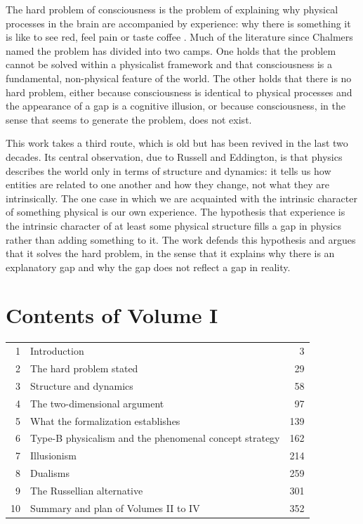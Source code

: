 \documentclass{situationist-preprint}
\begin{document}
The hard problem of consciousness is the problem of explaining why physical processes in the brain are accompanied by experience: why there is something it is like to see red, feel pain or taste coffee \citep{Chalmers1995}. Much of the literature since Chalmers named the problem has divided into two camps. One holds that the problem cannot be solved within a physicalist framework and that consciousness is a fundamental, non-physical feature of the world. The other holds that there is no hard problem, either because consciousness is identical to physical processes and the appearance of a gap is a cognitive illusion, or because consciousness, in the sense that seems to generate the problem, does not exist.

This work takes a third route, which is old but has been revived in the last two decades. Its central observation, due to Russell and Eddington, is that physics describes the world only in terms of structure and dynamics: it tells us how entities are related to one another and how they change, not what they are intrinsically. The one case in which we are acquainted with the intrinsic character of something physical is our own experience. The hypothesis that experience is the intrinsic character of at least some physical structure fills a gap in physics rather than adding something to it. The work defends this hypothesis and argues that it solves the hard problem, in the sense that it explains why there is an explanatory gap and why the gap does not reflect a gap in reality.

\section*{Contents of Volume I}

\begin{center}\small
\begin{tabular}{@{}rlr@{}}
1 & Introduction & 3 \\
2 & The hard problem stated & 29 \\
3 & Structure and dynamics & 58 \\
4 & The two-dimensional argument & 97 \\
5 & What the formalization establishes & 139 \\
6 & Type-B physicalism and the phenomenal concept strategy & 162 \\
7 & Illusionism & 214 \\
8 & Dualisms & 259 \\
9 & The Russellian alternative & 301 \\
10 & Summary and plan of Volumes II to IV & 352 \\
\end{tabular}
\end{center}
\end{document}
